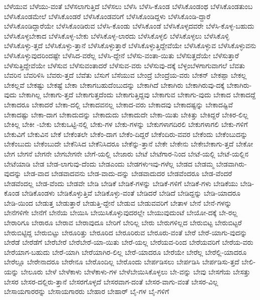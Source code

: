 {ಬೆಳೆಯುವ
ಬೆಳೆಯು-ವಂತೆ
ಬೆಳೆಸಲಾಗುತ್ತಿದೆ
ಬೆಳೆಸಲು
ಬೆಳೆಸಿ
ಬೆಳೆಸಿ-ಕೊಂಡ
ಬೆಳೆಸಿಕೊಂಡಂಥ
ಬೆಳೆಸಿಕೊಂಡತುಂಬ
ಬೆಳೆಸಿಕೊಂಡಮೇಲೆ
ಬೆಳೆಸಿಕೊಂಡರೆ
ಬೆಳೆಸಿಕೊಂಡವರಿಗೆ
ಬೆಳೆಸಿಕೊಂಡಿದ್ದಳು
ಬೆಳೆಸಿಕೊಂಡಿ-ದ್ದಾರೆ
ಬೆಳೆಸಿಕೊಂಡಿದ್ದಾರೆಯೇ
ಬೆಳೆಸಿಕೊಂಡಿರುವ
ಬೆಳೆಸಿ-ಕೊಂಡು
ಬೆಳೆಸಿಕೊಂಡೆ
ಬೆಳೆಸಿಕೊಳ್ಳದವರೇ
ಬೆಳೆಸಿ-ಕೊಳ್ಳ-ಬಹುದು
ಬೆಳೆಸಿಕೊಳ್ಳಬೇಕಾದ
ಬೆಳೆಸಿಕೊಳ್ಳ-ಬೇಕು
ಬೆಳೆಸಿಕೊಳ್ಳ-ಲಾರದು
ಬೆಳೆಸಿಕೊಳ್ಳಲಿ
ಬೆಳೆಸಿಕೊಳ್ಳಲು
ಬೆಳೆಸಿಕೊಳ್ಳಿ
ಬೆಳೆಸಿಕೊಳ್ಳು-ತ್ತದೆ
ಬೆಳೆಸಿಕೊಳ್ಳು-ತ್ತಾನೆ
ಬೆಳೆಸಿಕೊಳ್ಳುತ್ತಾರೆ
ಬೆಳೆಸಿಕೊಳ್ಳುತ್ತಿದ್ದೇವೆಯೇ
ಬೆಳೆಸಿಕೊಳ್ಳುವ
ಬೆಳೆಸಿಕೊಳ್ಳುವನು
ಬೆಳೆಸಿಕೊಳ್ಳುವುದರಿಂದಷ್ಟೇ
ಬೆಳೆಸಿದ-ವರೆಲ್ಲ
ಬೆಳೆಸಿ-ದ್ದೇನೆ
ಬೆಳೆಸು-ವಂತಾ-ಯಿತು
ಬೆಳೆಸುತ್ತದೆಯೇ
ಬೆಳೆಸುತ್ತಾರೆ
ಬೆಳೆಸುತ್ತಿದ್ದೇವೆಯೇ
ಬೆಳೆಸುವ
ಬೆಳೆಸುವಂತಾದರೆ
ಬೆಳೆಸುವ-ವರು
ಬೆಳೆಸುವು-ದಕ್ಕೆ
ಬೆಳ್ಳಂಬೆಳಗಾಗುವಾಗಲೆ
ಬೆವತು
ಬೆವರಿನ
ಬೆವರಿಳಿಸಿ
ಬೆವರು-ತ್ತದೆ
ಬೆವೆತು
ಬೆಸುಗೆ
ಬೆಸೆಯುವ
ಬೇಂದ್ರೆ
ಬೇಂದ್ರೆಯ-ವರು
ಬೇಕನ್
ಬೇಕಪ್ಪಾ
ಬೇಕಲ್ಲ
ಬೇಕಲ್ಲವೆ
ಬೇಕಷ್ಟು
ಬೇಕಷ್ಟೆ
ಬೇಕಾ
ಬೇಕಾಗಬಹುದೆಂಬುದನ್ನು
ಬೇಕಾಗಿದೆ
ಬೇಕಾಗಿರು
ಬೇಕಾಗಿರುವು-ದಕ್ಕೆ
ಬೇಕಾಗಿರು-ವುದು
ಬೇಕಾಗಿಲ್ಲ
ಬೇಕಾಗು-ತ್ತದೆ
ಬೇಕಾಗುತ್ತದೆಂದು
ಬೇಕಾಗುತ್ತಿದ್ದವು
ಬೇಕಾಗುವ
ಬೇಕಾಗು-ವುದು
ಬೇಕಾದ
ಬೇಕಾದದ್ದೆ
ಬೇಕಾದರೂ
ಬೇಕಾದರೆ
ಬೇಕಾ-ದಲ್ಲಿ
ಬೇಕಾದವನಲ್ಲ
ಬೇಕಾದ-ವರು
ಬೇಕಾದವು
ಬೇಕಾದಷ್ಟನ್ನು
ಬೇಕಾದಷ್ಟಿವೆ
ಬೇಕಾದಷ್ಟು
ಬೇಕಾ-ದಾಗ
ಬೇಕಾದುದನ್ನು
ಬೇಕಾದುದು
ಬೇಕಾದುದೇ
ಬೇಕಾ-ಯಿತು
ಬೇಕಿತ್ತು
ಬೇಕಿದ್ದರೆ
ಬೇಕಿರ-ಲಿಲ್ಲ
ಬೇಕಿಲ್ಲ
ಬೇಕೀ
-ಬೇಕು
ಬೇಕುಒಟ್ಟಿ-ನಲ್ಲಿ
ಬೇಕು-ಗಳ
ಬೇಕು-ಗಳನ್ನು
ಬೇಕುಗಳಾಗದಿರಲಿ
ಬೇಕುಗಳಾಗಲಿ
ಬೇಕು-ಗಳಿಗೆ
ಬೇಕುವಿಗೆ
ಬೇಕುವಿನ
ಬೇಕೆ
ಬೇಕೆಂತಲೇ
ಬೇಕೆಂ-ದಾಗ
ಬೇಕೆಂ-ದಿದ್ದರೆ
ಬೇಕೆಂದಿರು-ವವರ
ಬೇಕೆಂದು
ಬೇಕೆಂಬುದನ್ನು
ಬೇಕೆಂಬುದು
ಬೇಕೆಂಬುದೇ
ಬೇಕೆನಿಸಿದ
ಬೇಕೆನಿಸಿದರೂ
ಬೇಕೆನ್ನು-ತ್ತಾನೆ
ಬೇಕೇ
ಬೇಕೇನು
ಬೇಕೇಬೇಕಾಗು-ತ್ತದೆ
ಬೇಕೋ
ಬೇಗ
ಬೇಗನೆ
ಬೇಗನೇ
ಬೇಗಬೇಗನೇ
ಬೇಗೆ-ಯಲ್ಲಿ
ಬೇಜಾರು
ಬೇಟೆ
ಬೇಟೆಗಾರ-ನಿಂದ
ಬೇಟೆ-ಯಲ್ಲಿ
ಬೇಟೆ-ಯಲ್ಲಿನ
ಬೇಟೆಯಾಡಿ
ಬೇಡ
ಬೇಡ-ಲಾಗುವು-ದೆಂದು
ಬೇಡಎಂದು
ಬೇಡಗಳುಇವು-ಗಳೆಲ್ಲ
ಬೇಡದ
ಬೇಡಮ್ಮ
ಬೇಡವಾಗಿರು-ವುದನ್ನು
ಬೇಡ-ವಾದ
ಬೇಡವಾದವನು
ಬೇಡ-ವಾದು-ದನ್ನು
ಬೇಡವಾದುದರ
ಬೇಡವೆಂದರೂ
ಬೇಡ-ವೆಂದರೆ
ಬೇಡವೆಂದಲ್ಲ
ಬೇಡ-ವೆಂದು
ಬೇಡವೇ
ಬೇಡಿ
ಬೇಡಿಕೆ
ಬೇಡಿಕೆ-ಗಳನ್ನು
ಬೇಡಿಕೆ-ಗಳಿಗೆ
ಬೇಡಿಕೆ-ಗಳು
ಬೇಡಿಕೆಯು
ಬೇಡಿ-ಕೊಂಡ
ಬೇಡಿಕೊಂಡಳು
ಬೇಡಿಕೊಳ್ಳುತ್ತಿವೆ
ಬೇಡಿಕೊಳ್ಳು-ವಂತೆ
ಬೇಡಿದರೆ
ಬೇಡಿದೆ
ಬೇಡಿದ್ದನ್ನು
ಬೇಡಿ-ಯಾದರೂ
ಬೇಡಿ-ಯಿಂದ
ಬೇಡುತ್ತ
ಬೇಡುತ್ತಾರೆ
ಬೇಡುತ್ತಿ-ದ್ದೇನೆ
ಬೇಡುವ
ಬೇಡುವವರಿಗೆ
ಬೇತಾಳ
ಬೇನೆ
ಬೇನೆ-ಗಳನ್ನು
ಬೇನೆಗಳಿಗೇ
ಬೇನೆಗೆ
ಬೇನೆಯ
ಬೇಯಿಸಿ
ಬೇಯಿಸಿಕೊಳ್ಳುವುದರಲ್ಲೇ
ಬೇಯುವುದುಂಟೆ
ಬೇಯೋ-ದಕ್ಕೆ
ಬೇ-ರಲ್ಲ
ಬೇರಾರಿಗೂ
ಬೇರಾರೂ
ಬೇರಾವ
ಬೇರಾವುದೂ
ಬೇರಿಗೆ
ಬೇರಿಲ್ಲ
ಬೇರು
ಬೇರುಗಳಿಲ್ಲದ
ಬೇರುಬಿಟ್ಟ
ಬೇರುಬಿಟ್ಟರೆ
ಬೇರುಬಿಟ್ಟಿದ್ದ
ಬೇರುಬಿಟ್ಟು
ಬೇರೂರಿತ್ತು
ಬೇರೂರಿದ
ಬೇರೂರಿರುವ
ಬೇರೂರು-ವಂತೆ
ಬೇರೆ
ಬೇರೆ-ಯಾಗು-ವುದನ್ನು
ಬೇರೆಡೆ
ಬೇರೆಡೆಗೆ
ಬೇರೆಬೇರೆ
ಬೇರೆಬೇರೆ-ಯಾ-ಯಿತು
ಬೇರೆ-ಯಲ್ಲ
ಬೇರೆಯವ-ರಿಂದ
ಬೇರೆಯವರಿಗೆ
ಬೇರೆಯ-ವರು
ಬೇರೆಯಾಗ-ಬಹುದು
ಬೇರೆ-ಯಾಗಿ
ಬೇರೆಯಾಗಿರ-ಲಿಲ್ಲ
ಬೇರೆ-ಯಾದರೂ
ಬೇರೆಯೇ
ಬೇರೆಲ್ಲ
ಬೇರೆಲ್ಲಿ-ಯಾದರೂ
ಬೇರೆಲ್ಲೂ
ಬೇರೇನಾದರೂ
ಬೇರೇನೂ
ಬೇರೊಂದಿಲ್ಲ
ಬೇರೊಂದು
ಬೇರ್ಪಡಿಸಲು
ಬೇರ್ಪಡಿಸಿ
ಬೇರ್ಪಡಿಸು-ತ್ತದೆ
ಬೇಲಿ-ಯನ್ನು
ಬೇಲೂರು
ಬೇಳೆ
ಬೇಳೆಕಾಳು
ಬೇಳೆಕಾಳು-ಗಳ
ಬೇಳೆಬೇಯಿಸಿಕೊಳ್ಳಲು
ಬೇ-ವನ್ನು
ಬೇವು
ಬೇಸಗೆಯ
ಬೇಸತ್ತು
ಬೇಸರ
ಬೇಸರ-ದಲ್ಲಿರು-ತ್ತಾನೆ
ಬೇಸರಗೊಳ್ಳದೆ
ಬೇಸರವಾಗ-ದಂತೆ
ಬೇಸರ-ವಾಗು-ವಂತೆ
ಬೇಸರ-ವಿಲ್ಲ
ಬೇಸಾಯಗಾರರನ್ನು
ಬೇಸಾಯಗಾರರು
ಬೇಹಾರ
ಬೇಹಾರ್
ಬೈ-ಗಳ
ಬೈ-ಗಳಿಗೆ
}
